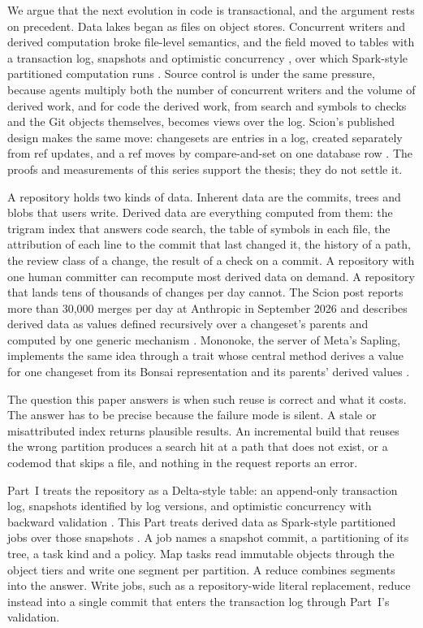 \documentclass[11pt,letterpaper]{article}
\theoremstyle{definition}
\theoremstyle{remark}
\begin{document}
We argue that the next evolution in code is transactional, and the argument rests on precedent. Data lakes began as files on object stores. Concurrent writers and derived computation broke file-level semantics, and the field moved to tables with a transaction log, snapshots and optimistic concurrency \cite{armbrust2020delta}, over which Spark-style partitioned computation runs \cite{zaharia2012rdd}. Source control is under the same pressure, because agents multiply both the number of concurrent writers and the volume of derived work, and for code the derived work, from search and symbols to checks and the Git objects themselves, becomes views over the log. Scion's published design makes the same move: changesets are entries in a log, created separately from ref updates, and a ref moves by compare-and-set on one database row \cite{anthropic2026scion}. The proofs and measurements of this series support the thesis; they do not settle it.

A repository holds two kinds of data. Inherent data are the commits, trees and blobs that users write. Derived data are everything computed from them: the trigram index that answers code search, the table of symbols in each file, the attribution of each line to the commit that last changed it, the history of a path, the review class of a change, the result of a check on a commit. A repository with one human committer can recompute most derived data on demand. A repository that lands tens of thousands of changes per day cannot. The Scion post reports more than 30,000 merges per day at Anthropic in September 2026 \cite{anthropic2026scion} %
and describes derived data as values defined recursively over a changeset's parents and computed by one generic mechanism \cite{anthropic2026scion}. Mononoke, the server of Meta's Sapling, implements the same idea through a trait whose central method derives a value for one changeset from its Bonsai representation and its parents' derived values \cite{mononokederived}.

The question this paper answers is when such reuse is correct and what it costs. The answer has to be precise because the failure mode is silent. A stale or misattributed index returns plausible results. An incremental build that reuses the wrong partition produces a search hit at a path that does not exist, or a codemod that skips a file, and nothing in the request reports an error.

Part~I treats the repository as a Delta-style table: an append-only transaction log, snapshots identified by log versions, and optimistic concurrency with backward validation \cite{armbrust2020delta}. This Part treats derived data as Spark-style partitioned jobs over those snapshots \cite{zaharia2012rdd}. A job names a snapshot commit, a partitioning of its tree, a task kind and a policy. Map tasks read immutable objects through the object tiers and write one segment per partition. A reduce combines segments into the answer. Write jobs, such as a repository-wide literal replacement, reduce instead into a single commit that enters the transaction log through Part~I's validation.
\end{document}
